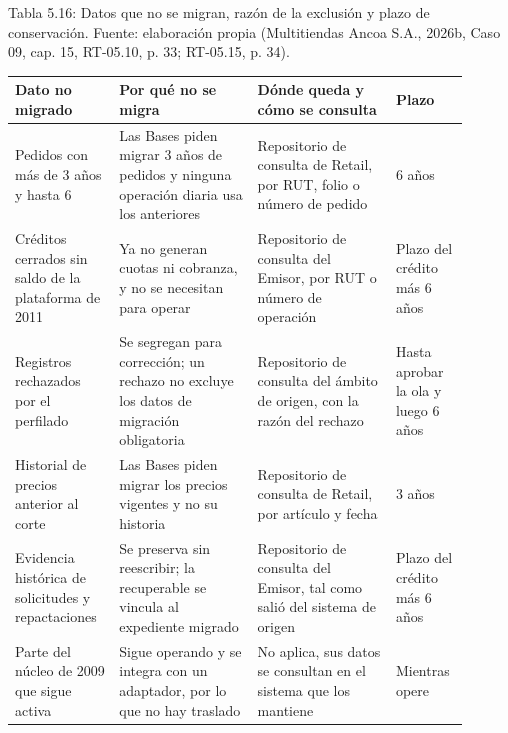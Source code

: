 \documentclass[11pt]{article}
\begin{document}
\par\vspace{0.6\baselineskip}\noindent\begin{minipage}{\linewidth}
Tabla 5.16: Datos que no se migran, razón de la exclusión y plazo de conservación. Fuente: elaboración propia (Multitiendas Ancoa S.A., 2026b, Caso 09, cap. 15, RT-05.10, p. 33; RT-05.15, p. 34).\label{tab:t21}\par\vspace{0.3\baselineskip}
\begin{tabular}{@{}p{0.212\linewidth}p{0.285\linewidth}p{0.285\linewidth}p{0.120\linewidth}@{}}
\toprule Dato no migrado & Por qué no se migra & Dónde queda y cómo se consulta & Plazo \\
\midrule
Pedidos con más de 3 años y hasta 6 & Las Bases piden migrar 3 años de pedidos y ninguna operación diaria usa los anteriores & Repositorio de consulta de Retail, por RUT, folio o número de pedido & 6 años \\
Créditos cerrados sin saldo de la plataforma de 2011 & Ya no generan cuotas ni cobranza, y no se necesitan para operar & Repositorio de consulta del Emisor, por RUT o número de operación & Plazo del crédito más 6 años \\
Registros rechazados por el perfilado & Se segregan para corrección; un rechazo no excluye los datos de migración obligatoria & Repositorio de consulta del ámbito de origen, con la razón del rechazo & Hasta aprobar la ola y luego 6 años \\
Historial de precios anterior al corte & Las Bases piden migrar los precios vigentes y no su historia & Repositorio de consulta de Retail, por artículo y fecha & 3 años \\
Evidencia histórica de solicitudes y repactaciones & Se preserva sin reescribir; la recuperable se vincula al expediente migrado & Repositorio de consulta del Emisor, tal como salió del sistema de origen & Plazo del crédito más 6 años \\
Parte del núcleo de 2009 que sigue activa & Sigue operando y se integra con un adaptador, por lo que no hay traslado & No aplica, sus datos se consultan en el sistema que los mantiene & Mientras opere \\
\bottomrule
\end{tabular}
\end{minipage}
\par
\end{document}
